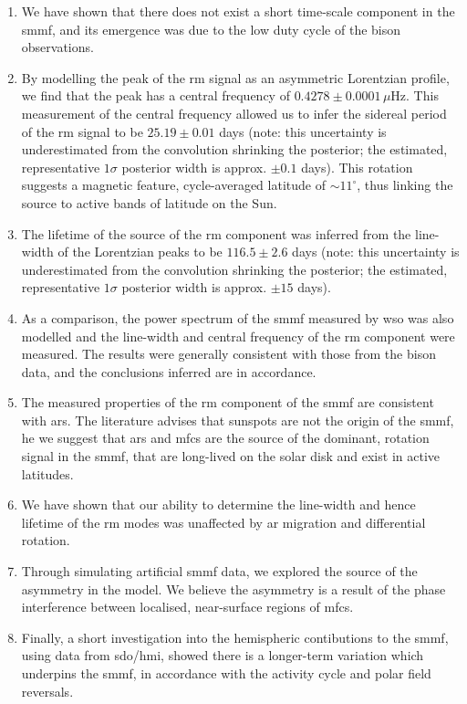 \begin{enumerate}
	\item{We have shown that there does not exist a short time-scale component in the \gls{smmf}, and its emergence was due to the low duty cycle of the \gls{bison} observations.}
	
	\item{By modelling the peak of the \gls{rm} signal as an asymmetric Lorentzian profile, we find that the peak has a central frequency of $0.4278\pm0.0001\,\mu\mathrm{Hz}$. This measurement of the central frequency allowed us to infer the sidereal period of the \gls{rm} signal to be $25.19\pm0.01$ days (note: this uncertainty is underestimated from the convolution shrinking the posterior; the estimated, representative $1\sigma$ posterior width is approx. $\pm 0.1$ days). This rotation suggests a magnetic feature, cycle-averaged latitude of $\sim 11^{\circ}$, thus linking the source to active bands of latitude on the Sun.}
	
	\item{The lifetime of the source of the \gls{rm} component was inferred from the line-width of the Lorentzian peaks to be $116.5\pm2.6$ days (note: this uncertainty is underestimated from the convolution shrinking the posterior; the estimated, representative $1\sigma$ posterior width is approx. $\pm 15$ days).}
	
	\item{As a comparison, the power spectrum of the \gls{smmf} measured by \gls{wso} was also modelled and the line-width and central frequency of the \gls{rm} component were measured. The results were generally consistent with those from the \gls{bison} data, and the conclusions inferred are in accordance.}
	
	\item{The measured properties of the \gls{rm} component of the \gls{smmf} are consistent with \glspl{ar}. The literature advises that sunspots are not the origin of the \gls{smmf}, he we suggest that \glspl{ar} and \glspl{mfc} are the source of the dominant, rotation signal in the \gls{smmf}, that are long-lived on the solar disk and exist in active latitudes.}
		
	\item{We have shown that our ability to determine the line-width and hence lifetime of the \gls{rm} modes was unaffected by \gls{ar} migration and differential rotation.}
	
	\item{Through simulating artificial \gls{smmf} data, we explored the source of the asymmetry in the model. We believe the asymmetry is a result of the phase interference between localised, near-surface regions of \glspl{mfc}.}
	
	\item{Finally, a short investigation into the hemispheric contibutions to the \gls{smmf}, using data from \gls{sdo/hmi}, showed there is a longer-term variation which underpins the \gls{smmf}, in accordance with the activity cycle and polar field reversals.}
\end{enumerate}


